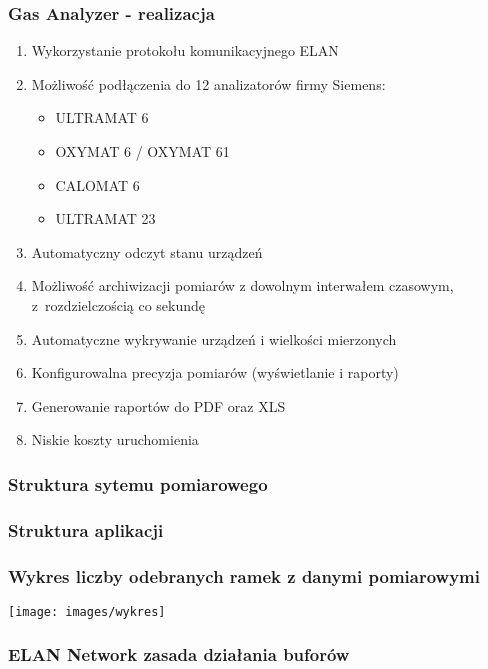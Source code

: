 \documentclass[ucs]{beamer}
\begin{document}

\begin{frame}
\frametitle{Gas Analyzer - realizacja}
\begin{enumerate}
\item Wykorzystanie protokołu komunikacyjnego ELAN
\item Możliwość podłączenia do 12 analizatorów firmy Siemens:
\begin{itemize}
\item ULTRAMAT 6
\item OXYMAT 6 / OXYMAT 61
\item CALOMAT 6
\item ULTRAMAT 23
\end{itemize}
\item Automatyczny odczyt stanu urządzeń
\item Możliwość archiwizacji pomiarów z dowolnym interwałem czasowym, z~rozdzielczością co sekundę
\item Automatyczne wykrywanie urządzeń i wielkości mierzonych
\item Konfigurowalna precyzja pomiarów (wyświetlanie i raporty)
\item Generowanie raportów do PDF oraz XLS
\item Niskie koszty uruchomienia
\end{enumerate}
\end{frame}

\begin{frame}
\frametitle{Struktura sytemu pomiarowego}

\end{frame}

\begin{frame}
\frametitle{Struktura aplikacji}
\begin{center}

\end{center}
\end{frame}

\begin{frame}
\frametitle{Wykres liczby odebranych ramek z danymi pomiarowymi}
\texttt{[image: images/wykres]}
\end{frame}

\begin{frame}
\frametitle{ELAN Network zasada działania buforów}

\end{frame}
\end{document}

